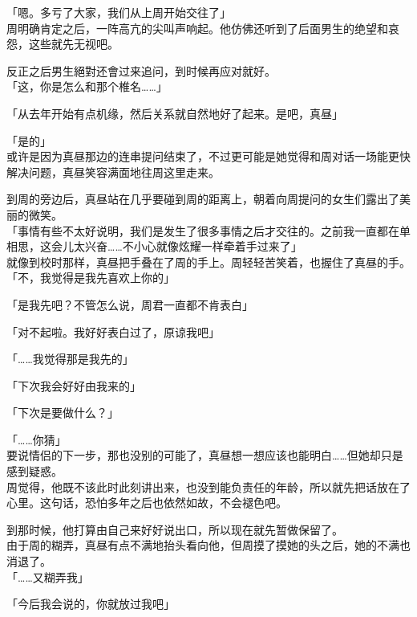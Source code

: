 「嗯。多亏了大家，我们从上周开始交往了」\\

周明确肯定之后，一阵高亢的尖叫声响起。他仿佛还听到了后面男生的绝望和哀怨，这些就先无视吧。

反正之后男生絕對还會过来追问，到时候再应对就好。\\

「这，你是怎么和那个椎名……」

「从去年开始有点机缘，然后关系就自然地好了起来。是吧，真昼」

「是的」\\

或许是因为真昼那边的连串提问结束了，不过更可能是她觉得和周对话一场能更快解决问题，真昼笑容满面地往周这里走来。

到周的旁边后，真昼站在几乎要碰到周的距离上，朝着向周提问的女生们露出了美丽的微笑。\\

「事情有些不太好说明，我们是发生了很多事情之后才交往的。之前我一直都在单相思，这会儿太兴奋……不小心就像炫耀一样牵着手过来了」\\

就像到校时那样，真昼把手叠在了周的手上。周轻轻苦笑着，也握住了真昼的手。\\

「不，我觉得是我先喜欢上你的」

「是我先吧？不管怎么说，周君一直都不肯表白」

「对不起啦。我好好表白过了，原谅我吧」

「……我觉得那是我先的」

「下次我会好好由我来的」

「下次是要做什么？」

「……你猜」\\

要说情侣的下一步，那也没别的可能了，真昼想一想应该也能明白……但她却只是感到疑惑。\\

周觉得，他既不该此时此刻讲出来，也没到能负责任的年龄，所以就先把话放在了心里。这句话，恐怕多年之后也依然如故，不会褪色吧。

到那时候，他打算由自己来好好说出口，所以现在就先暂做保留了。\\

由于周的糊弄，真昼有点不满地抬头看向他，但周摸了摸她的头之后，她的不满也消退了。\\

「……又糊弄我」

「今后我会说的，你就放过我吧」

